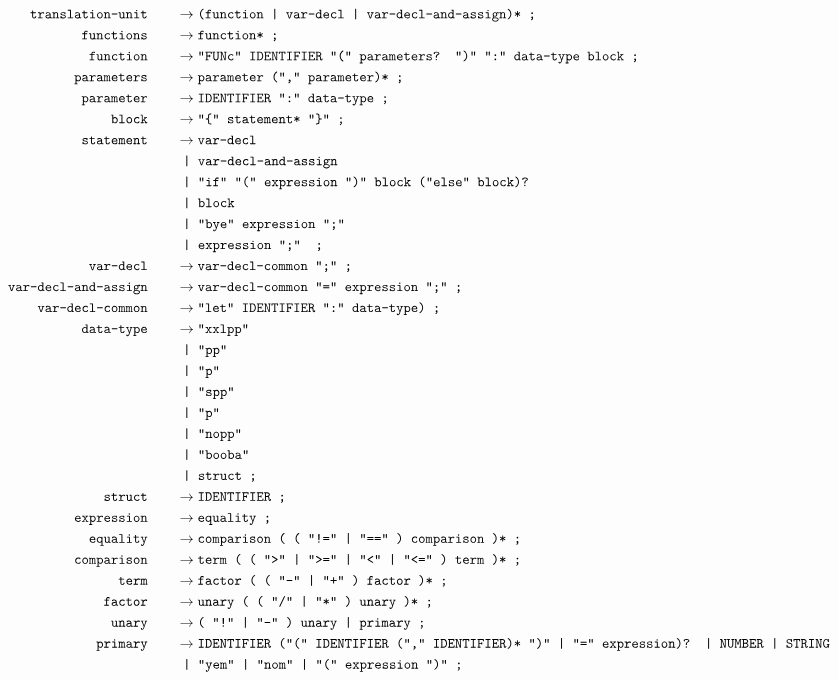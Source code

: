 \documentclass[12pt, a4paper]{article}
\newcommand{\ttt}[1]{
    \text{\texttt{#1}}
}
\newcommand{\ebnfnode}[2]{%
    #1\hspace{20px} &\to #2\ttt{ ;}\\
}
\newcommand{\ebnfnodett}[2]{%
    \ebnfnode{\ttt{#1}}{\ttt{#2}}
}
\begin{document}
    \begin{align*}
        \ebnfnodett{translation-unit}{(function | var-decl | var-decl-and-assign)*}
        \ebnfnodett{functions}{function*}
        \ebnfnodett{function}{"FUNc" IDENTIFIER "(" parameters? ")" ":" data-type block}
        \ebnfnodett{parameters}{parameter ("," parameter)*}
        \ebnfnodett{parameter}{IDENTIFIER ":" data-type}
        \ebnfnodett{block}{"\{" statement* "\}"}
        \ebnfnode{\ttt{statement}}
        {%
            \ttt{var-decl}\\
            &\ttt{ | var-decl-and-assign }\\
            &\ttt{ | "if" "(" expression ")" block ("else" block)?}\\
            &\ttt{ | block }\\
            &\ttt{ | "bye" expression ";" }\\
            &\ttt{ | expression ";" }
        }
        \ebnfnodett{var-decl}{var-decl-common ";"}
        \ebnfnodett{var-decl-and-assign}{var-decl-common "=" expression ";"}
        \ebnfnodett{var-decl-common}{"let" IDENTIFIER ":" data-type)}
        \ebnfnode{\ttt{data-type}}
        {%
            \ttt{"xxlpp"}\\
            &\ttt{ | "pp"}\\
            &\ttt{ | "p"}\\
            &\ttt{ | "spp"}\\
            &\ttt{ | "p"}\\
            &\ttt{ | "nopp"}\\
            &\ttt{ | "booba"}\\
            &\ttt{ | struct}
        }
        \ebnfnodett{struct}{IDENTIFIER}
        \ebnfnodett{expression}{equality}
        \ebnfnodett{equality}{comparison ( ( "!=" | "==" ) comparison )*}
        \ebnfnodett{comparison}{term ( ( ">" | ">=" | "<" | "<=" ) term )*}
        \ebnfnodett{term}{factor ( ( "-" | "+" ) factor )*}
        \ebnfnodett{factor}{unary ( ( "/" | "*" ) unary )*}
        \ebnfnodett{unary}{( "!" | "-" ) unary | primary}
        \ebnfnode{\ttt{primary}}
        {%
            \ttt{IDENTIFIER ("(" IDENTIFIER ("," IDENTIFIER)* ")" | "=" expression)? | NUMBER | STRING}\\
            &\ttt{ | "yem" | "nom" | "(" expression ")"}
        }
    \end{align*}
\end{document}
